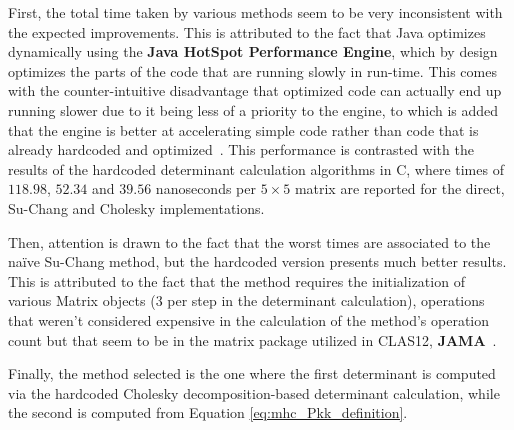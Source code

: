 First, the total time taken by various methods seem to be very inconsistent with the expected improvements.
This is attributed to the fact that Java optimizes dynamically using the \textbf{Java HotSpot Performance Engine}, which by design optimizes the parts of the code that are running slowly in run-time.
This comes with the counter-intuitive disadvantage that optimized code can actually end up running slower due to it being less of a priority to the engine, to which is added that the engine is better at accelerating simple code rather than code that is already hardcoded and optimized~\cite{meloan1999java}.
This performance is contrasted with the results of the hardcoded determinant calculation algorithms in C, where times of $118.98$, $52.34$ and $39.56$ nanoseconds per $5\times5$ matrix are reported for the direct, Su-Chang and Cholesky implementations.

Then, attention is drawn to the fact that the worst times are associated to the na\"ive Su-Chang method, but the hardcoded version presents much better results.
This is attributed to the fact that the method requires the initialization of various Matrix objects ($3$ per step in the determinant calculation), operations that weren't considered expensive in the calculation of the method's operation count but that seem to be in the matrix package utilized in CLAS12, \textbf{JAMA}~\cite{hicklin2000jama}.

Finally, the method selected is the one where the first determinant is computed via the hardcoded Cholesky decomposition-based determinant calculation, while the second is computed from Equation \eqref{eq:mhc_Pkk_definition}.
